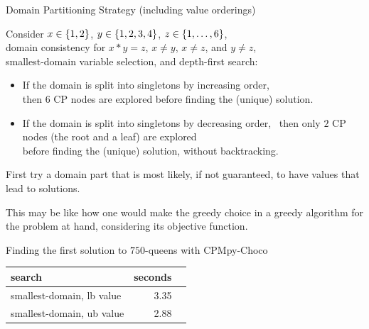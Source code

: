\documentclass{cons-beamer}
\begin{document}
\begin{frame}{Domain Partitioning Strategy}
  (including value orderings)\vfill

  \begin{example}
    Consider $x \in \left\{1,2\right\}$, $y \in \left\{1,2,3,4\right\}$, $z \in \left\{1,\dots,6\right\}$, \\
    domain consistency for $x * y = z$, $x \neq y$, $x \neq z$, and $y \neq z$, \\
    smallest-domain variable selection, and depth-first search:

    \begin{itemize}
      \item If the domain is split into singletons by increasing order, \\
        then $6$ CP nodes are explored before finding the (unique) solution.

      \item If the domain is split into singletons by decreasing order, \
        then only $2$ CP nodes (the root and a leaf) are explored \\
        before finding the (unique) solution, without backtracking.
    \end{itemize}
  \end{example}
\end{frame}

\begin{frame}\label{varval}
  \begin{definition}
    First try a domain part that is most likely, if not guaranteed, to
    have values that lead to solutions.
  \end{definition} \vfill%

  This may be like how one would make the greedy choice in a greedy
    algorithm for the problem at hand, considering its objective
    function.
    
  \begin{example}
    Finding the first solution to $750$-queens with CPMpy-Choco
    \begin{center}
      \begin{tabular}{lrr}
        search & seconds \\
        \midrule
        smallest-domain, lb value & 3.35 \\
        smallest-domain, ub value & 2.88 \\
      \end{tabular}
    \end{center}
  \end{example}
\end{frame}
\end{document}
